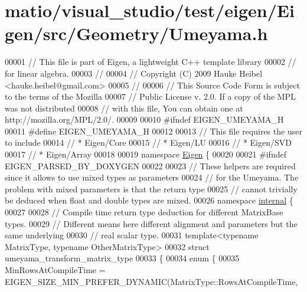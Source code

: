 \hypertarget{matio_2visual__studio_2test_2eigen_2_eigen_2src_2_geometry_2_umeyama_8h_source}{}\section{matio/visual\+\_\+studio/test/eigen/\+Eigen/src/\+Geometry/\+Umeyama.h}
\label{matio_2visual__studio_2test_2eigen_2_eigen_2src_2_geometry_2_umeyama_8h_source}

\begin{DoxyCode}
00001 \textcolor{comment}{// This file is part of Eigen, a lightweight C++ template library}
00002 \textcolor{comment}{// for linear algebra.}
00003 \textcolor{comment}{//}
00004 \textcolor{comment}{// Copyright (C) 2009 Hauke Heibel <hauke.heibel@gmail.com>}
00005 \textcolor{comment}{//}
00006 \textcolor{comment}{// This Source Code Form is subject to the terms of the Mozilla}
00007 \textcolor{comment}{// Public License v. 2.0. If a copy of the MPL was not distributed}
00008 \textcolor{comment}{// with this file, You can obtain one at http://mozilla.org/MPL/2.0/.}
00009 
00010 \textcolor{preprocessor}{#ifndef EIGEN\_UMEYAMA\_H}
00011 \textcolor{preprocessor}{#define EIGEN\_UMEYAMA\_H}
00012 
00013 \textcolor{comment}{// This file requires the user to include }
00014 \textcolor{comment}{// * Eigen/Core}
00015 \textcolor{comment}{// * Eigen/LU }
00016 \textcolor{comment}{// * Eigen/SVD}
00017 \textcolor{comment}{// * Eigen/Array}
00018 
00019 \textcolor{keyword}{namespace }\hyperlink{namespace_eigen}{Eigen} \{ 
00020 
00021 \textcolor{preprocessor}{#ifndef EIGEN\_PARSED\_BY\_DOXYGEN}
00022 
00023 \textcolor{comment}{// These helpers are required since it allows to use mixed types as parameters}
00024 \textcolor{comment}{// for the Umeyama. The problem with mixed parameters is that the return type}
00025 \textcolor{comment}{// cannot trivially be deduced when float and double types are mixed.}
00026 \textcolor{keyword}{namespace }\hyperlink{namespaceinternal}{internal} \{
00027 
00028 \textcolor{comment}{// Compile time return type deduction for different MatrixBase types.}
00029 \textcolor{comment}{// Different means here different alignment and parameters but the same underlying}
00030 \textcolor{comment}{// real scalar type.}
00031 \textcolor{keyword}{template}<\textcolor{keyword}{typename} MatrixType, \textcolor{keyword}{typename} OtherMatrixType>
00032 \textcolor{keyword}{struct }umeyama\_transform\_matrix\_type
00033 \{
00034   \textcolor{keyword}{enum} \{
00035     MinRowsAtCompileTime = EIGEN\_SIZE\_MIN\_PREFER\_DYNAMIC(MatrixType::RowsAtCompileTime, 

\end{DoxyCode}
